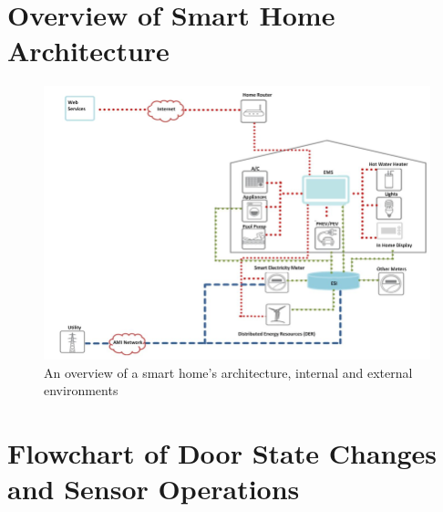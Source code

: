 \cleardoublepage

\begin{appendices}

    \section{Overview of Smart Home Architecture \cite{komninosEtAl2014}}
    \label{sec:overview-of-smart-home-architecture}

    \begin{figure}[h!]
        \includegraphics[width=\linewidth]{datasets/images/A1}
        \caption{An overview of a smart home's architecture, internal and external environments}
        \label{fig:figure4}
    \end{figure}

    \cleardoublepage


    \section{Flowchart of Door State Changes and Sensor Operations \cite{joseMalekian2017}}
    \label{sec:flowchart-of-door-state-changes-and-sensor-operations}


\end{appendices}
